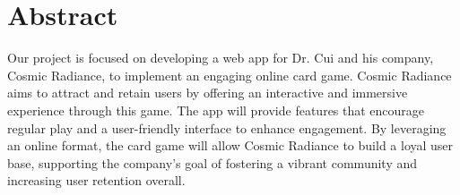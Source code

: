 \section*{Abstract}






Our project is focused on developing a web app for Dr. Cui and his company, Cosmic Radiance, to implement an engaging online card game. Cosmic Radiance aims to attract and retain users by offering an interactive and immersive experience through this game. The app will provide features that encourage regular play and a user-friendly interface to enhance engagement. By leveraging an online format, the card game will allow Cosmic Radiance to build a loyal user base, supporting the company’s goal of fostering a vibrant community and increasing user retention overall.



